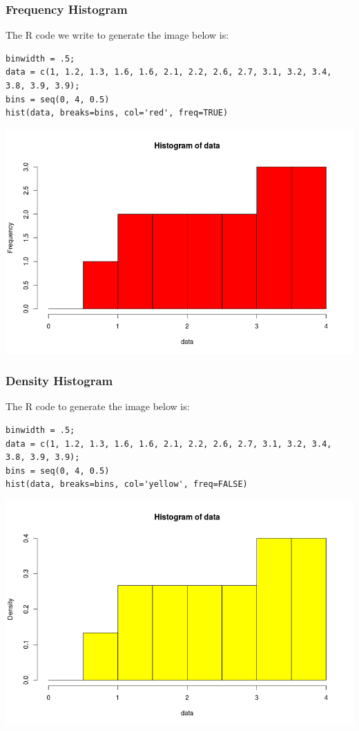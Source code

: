 \documentclass[a4paper,11pt]{article}
\begin{document}
\subsubsection{Frequency Histogram}

The R code we write to generate the image below is:

\begin{lstlisting}
binwidth = .5;
data = c(1, 1.2, 1.3, 1.6, 1.6, 2.1, 2.2, 2.6, 2.7, 3.1, 3.2, 3.4, 3.8, 3.9, 3.9);
bins = seq(0, 4, 0.5)
hist(data, breaks=bins, col='red', freq=TRUE)
\end{lstlisting}

\includegraphics[scale=0.5]{freq-hist-1}

\subsubsection{Density Histogram}

The R code to generate the image below is:

\begin{lstlisting}
binwidth = .5;
data = c(1, 1.2, 1.3, 1.6, 1.6, 2.1, 2.2, 2.6, 2.7, 3.1, 3.2, 3.4, 3.8, 3.9, 3.9);
bins = seq(0, 4, 0.5)
hist(data, breaks=bins, col='yellow', freq=FALSE)
\end{lstlisting}

\includegraphics[scale=0.5]{dens--hist-1}
\end{document}
